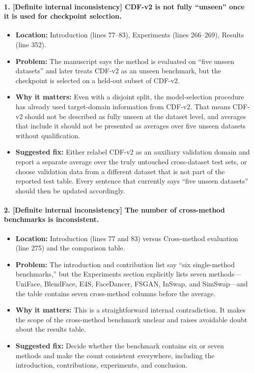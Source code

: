 \documentclass[11pt]{article}
\begin{document}
\paragraph{1. [Definite internal inconsistency] CDF-v2 is not fully ``unseen'' once it is used for checkpoint selection.}
\begin{itemize}
    \item \textbf{Location:} Introduction (lines 77--83), Experiments (lines 266--269), Results (line 352).
    \item \textbf{Problem:} The manuscript says the method is evaluated on ``five unseen datasets'' and later treats CDF-v2 as an unseen benchmark, but the checkpoint is selected on a held-out subset of CDF-v2.
    \item \textbf{Why it matters:} Even with a disjoint split, the model-selection procedure has already used target-domain information from CDF-v2. That means CDF-v2 should not be described as fully unseen at the dataset level, and averages that include it should not be presented as averages over five unseen datasets without qualification.
    \item \textbf{Suggested fix:} Either relabel CDF-v2 as an auxiliary validation domain and report a separate average over the truly untouched cross-dataset test sets, or choose validation data from a different dataset that is not part of the reported test table. Every sentence that currently says ``five unseen datasets'' should then be updated accordingly.
\end{itemize}

\paragraph{2. [Definite internal inconsistency] The number of cross-method benchmarks is inconsistent.}
\begin{itemize}
    \item \textbf{Location:} Introduction (lines 77 and 83) versus Cross-method evaluation (line 275) and the comparison table.
    \item \textbf{Problem:} The introduction and contribution list say ``six single-method benchmarks,'' but the Experiments section explicitly lists seven methods---UniFace, BlendFace, E4S, FaceDancer, FSGAN, InSwap, and SimSwap---and the table contains seven cross-method columns before the average.
    \item \textbf{Why it matters:} This is a straightforward internal contradiction. It makes the scope of the cross-method benchmark unclear and raises avoidable doubt about the results table.
    \item \textbf{Suggested fix:} Decide whether the benchmark contains six or seven methods and make the count consistent everywhere, including the introduction, contributions, experiments, and conclusion.
\end{itemize}
\end{document}
